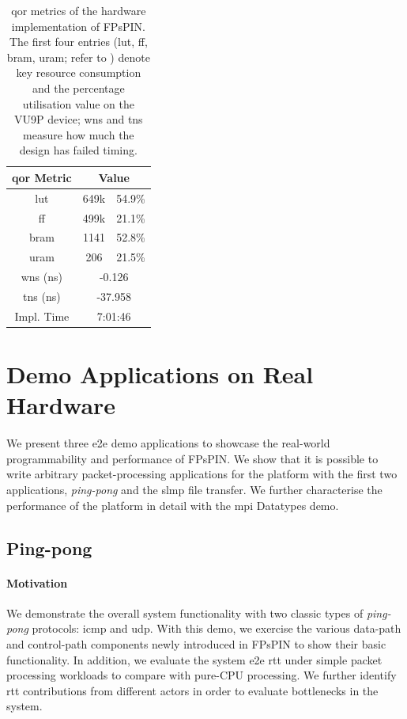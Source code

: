 \begin{table}[tp]
    \centering
    \begin{tabular}{ccc}
    \toprule
    \ac{qor} Metric & \multicolumn{2}{c}{Value} \\ \midrule
    \ac{lut} & 649k & 54.9\% \\
    \ac{ff} & 499k & 21.1\% \\
    \ac{bram} & 1141 & 52.8\% \\
    \ac{uram} & 206 & 21.5\% \\
    \ac{wns} (ns) & \multicolumn{2}{c}{-0.126} \\
    \ac{tns} (ns) & \multicolumn{2}{c}{-37.958} \\
    Impl. Time & \multicolumn{2}{c}{7:01:46} \\
    \bottomrule
    \end{tabular}
    \caption{\ac{qor} metrics of the hardware implementation of FPsPIN.  The first four entries (\ac{lut}, \ac{ff}, \ac{bram}, \ac{uram}; refer to ) denote key resource consumption and the percentage utilisation value on the VU9P device; \ac{wns} and \ac{tns} measure how much the design has failed timing.} \label{tab:design-qor}
\end{table}

\section{Demo Applications on Real Hardware} \label{sec:demos}

We present three \ac{e2e} demo applications to showcase the real-world programmability and performance of FPsPIN.  We show that it is possible to write arbitrary packet-processing applications for the platform with the first two applications, \emph{ping-pong} and the \ac{slmp} file transfer.  We further characterise the performance of the platform in detail with the \ac{mpi} Datatypes demo.


\subsection{Ping-pong}

\paragraph{Motivation} We demonstrate the overall system functionality with two classic types of \emph{ping-pong} protocols: \ac{icmp} and \ac{udp}.  With this demo, we exercise the various data-path and control-path components newly introduced in FPsPIN to show their basic functionality.  In addition, we evaluate the system \ac{e2e} \ac{rtt} under simple packet processing workloads to compare with pure-CPU processing.  We further identify \ac{rtt} contributions from different actors in order to evaluate bottlenecks in the system.

